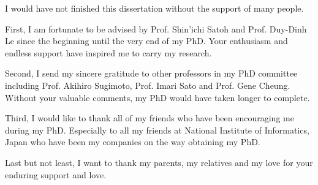
\begin{acknowledgements}      


I would have not finished this dissertation without the support of many people. 

First, I am fortunate to be advised by Prof. Shin'ichi Satoh and Prof. Duy-Dinh Le since the beginning until the very end of my PhD. Your enthusiasm and endless support have inspired me to carry my research.     

Second, I send my sincere gratitude to other professors in my PhD committee including Prof. Akihiro Sugimoto, Prof. Imari Sato and Prof. Gene Cheung. Without your valuable comments, my PhD would have taken longer to complete. 

Third, I would like to thank all of my friends who have been encouraging me during my PhD. Especially to all my friends at National Institute of Informatics, Japan who have been my companies on the way obtaining my PhD.  

Last but not least, I want to thank my parents, my relatives and my love for your enduring support and love. 

\end{acknowledgements}
